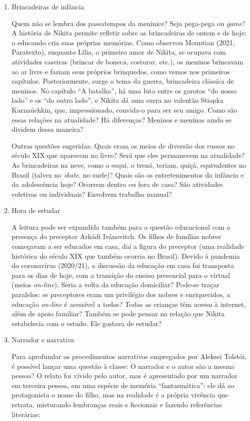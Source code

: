 \documentclass{article}
\begin{document}
\begin{enumerate}
\item
Brincadeiras de infância

Quem não se lembra dos passatempos da meninice? Seja pega-pega ou
\emph{game}? A história de Nikita permite refletir sobre as brincadeiras
de ontem e de hoje: o educando cria suas próprias memórias. Como
observou Mountian (2021, Paratexto), enquanto Lília, o primeiro amor de
Nikita, se ocupava com atividades caseiras (brincar de boneca, costurar,
etc.), os meninos brincavam ao ar livre e faziam seus próprios
brinquedos, como vemos nos primeiros capítulos. Posteriormente, surge o
tema da guerra, brincadeira clássica de meninos. No capítulo ``A
batalha'', há uma luta entre os garotos ``do nosso lado'' e os ``do
outro lado'', e Nikita dá uma surra no valentão Stiopka Karnaúchkin,
que, impressionado, convida-o para ser seu amigo. Como são essas
relações na atualidade? Há diferenças? Meninos e meninas ainda se
dividem dessa maneira?

Outras questões sugeridas: Quais eram os meios de diversão dos russos
no século XIX que aparecem no livro? Será que eles permanecem na
atualidade? As brincadeiras na neve, como o esqui, o trenó, teriam,
quiçá, equivalentes no Brasil (talvez no \emph{skate}, no surfe)? Quais
são os entretenimentos da infância e da adolescência hoje? Ocorrem
dentro ou fora de casa? São atividades coletivas ou individuais?
Envolvem trabalho manual?

\item
Hora de estudar

A leitura pode ser expandida também para a questão educacional com a
presença do preceptor Arkádi Ivánovitch. Os filhos de famílias nobres
começavam a ser educados em casa, daí a figura do preceptor (uma
realidade histórica do século XIX que também ocorria no Brasil). Devido
à pandemia do coronavírus (2020/21), a discussão da educação em casa foi
transposta para os dias de hoje, com a transição do ensino presencial
para o virtual (meios \emph{on-line}). Seria a volta da educação
domiciliar? Pode-se traçar paralelos: se preceptores eram um privilégio
dos nobres e enriquecidos, a educação \emph{on-line} é acessível a
todos? Todas as crianças têm acesso à internet, além de apoio familiar?
Também se pode pensar na relação que Nikita estabelecia com o estudo.
Ele gostava de estudar?

\item
Narrador e narrativa

Para aprofundar os procedimentos narrativos empregados por Aleksei
Tolstói, é possível lançar uma questão à classe: O narrador e o autor
são a mesma pessoa? O relato foi vivido pelo autor, mas é apresentado
por um narrador em terceira pessoa, em uma espécie de memória
``fantasmática'': ele dá ao protagonista o nome do filho, mas na
realidade é a própria vivência que retrata, misturando lembranças reais
e ficcionais e fazendo referências literárias:


\end{enumerate}
\end{document}
